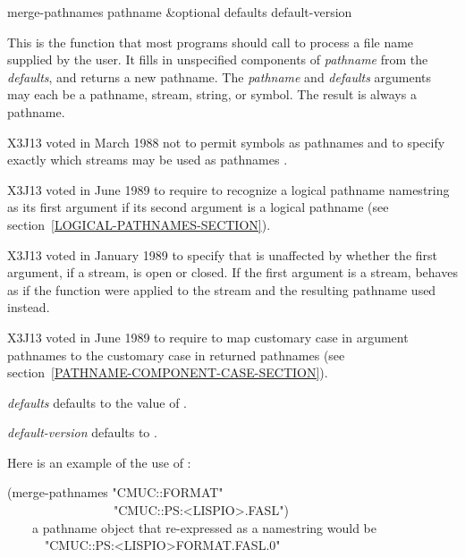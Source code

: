 \begin{defun}[Function]
merge-pathnames pathname &optional defaults default-version


\begin{obsolete}
This is the function that most programs should call to process a file
name supplied by the user.  It fills in unspecified components of
\emph{pathname} from the \emph{defaults}, and returns a new pathname.  The
\emph{pathname} and \emph{defaults} arguments may each
be a pathname, stream, string, or symbol.  The
result is always a pathname.
\end{obsolete}

\begin{new}
X3J13 voted in March 1988
not to permit symbols as pathnames
 and
to specify exactly which streams may be used as pathnames
.
\end{new}

\begin{newer}
X3J13 voted in June 1989  to require 
to recognize a logical pathname namestring as its first argument
if its second argument is a logical pathname (see section~\ref{LOGICAL-PATHNAMES-SECTION}).
\end{newer}

\begin{new}
X3J13 voted in January 1989
to specify that  is unaffected by
whether the first argument, if a stream, is open or closed. If the first
argument is a stream,  behaves as if the function
 were applied to the stream and the resulting pathname used instead.
\end{new}

\begin{newer}
X3J13 voted in June 1989  to
require  to map customary case in argument
pathnames to the customary case in returned pathnames
(see section~\ref{PATHNAME-COMPONENT-CASE-SECTION}).
\end{newer}

\emph{defaults} defaults to the value of .

\emph{default-version} defaults to .

Here is an example of the use of :
\begin{lisp}
(merge-pathnames "CMUC::FORMAT" \\
~~~~~~~~~~~~~~~~~"CMUC::PS:<LISPIO>.FASL") \\
~~~\EV\ \textrm{a pathname object that re-expressed as a namestring would be} \\
~~~~~~"CMUC::PS:<LISPIO>FORMAT.FASL.0"
\end{lisp}


\end{defun}
